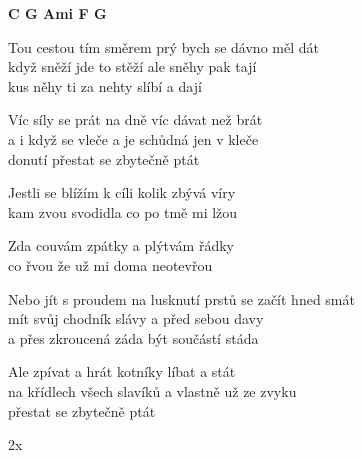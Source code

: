
\re{}
{\footnotesize \textbf{C  G  Ami  F  G}}

\ve{}
Tou cestou tím směrem prý bych se dávno měl dát\\
když sněží jde to stěží ale sněhy pak tají\\
kus něhy ti za nehty slíbí a dají

\ve{}
Víc síly se prát na dně víc dávat než brát\\
a i když se vleče a je schůdná jen v kleče\\
donutí přestat se zbytečně ptát

\cho{}
Jestli se blížím k cíli kolik zbývá víry\\
kam zvou svodidla co po tmě mi lžou

Zda couvám zpátky a plýtvám řádky\\
co řvou že už mi doma neotevřou
 
\ve{}
Nebo jít s proudem na lusknutí prstů se začít hned smát\\
mít svůj chodník slávy a před sebou davy\\
a přes zkroucená záda být součástí stáda

\ve{}
Ale zpívat a hrát kotníky líbat a stát\\
na křídlech všech slavíků a vlastně už ze zvyku\\
přestat se zbytečně ptát

\cho{} 2x

\esong{}

